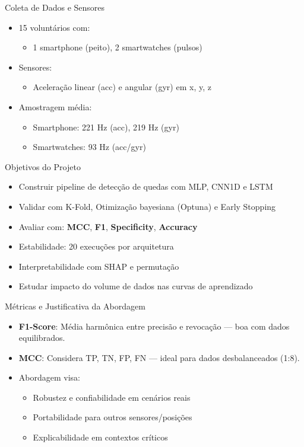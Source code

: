\documentclass[10pt]{beamer}
\begin{document}
\begin{frame}{Coleta de Dados e Sensores}
  \begin{itemize}
    \item 15 voluntários com:
    \begin{itemize}
      \item 1 smartphone (peito), 2 smartwatches (pulsos)
    \end{itemize}
    \item Sensores:
    \begin{itemize}
      \item Aceleração linear (acc) e angular (gyr) em x, y, z
    \end{itemize}
    \item Amostragem média:
    \begin{itemize}
      \item Smartphone: 221 Hz (acc), 219 Hz (gyr)
      \item Smartwatches: 93 Hz (acc/gyr)
    \end{itemize}
  \end{itemize}
\end{frame}


\begin{frame}{Objetivos do Projeto}
  \begin{itemize}
    \item Construir pipeline de detecção de quedas com MLP, CNN1D e LSTM
    \item Validar com K-Fold, Otimização bayesiana (Optuna) e Early Stopping
    \item Avaliar com: \textbf{MCC}, \textbf{F1}, \textbf{Specificity}, \textbf{Accuracy}
    \item Estabilidade: 20 execuções por arquitetura
    \item Interpretabilidade com SHAP e permutação
    \item Estudar impacto do volume de dados nas curvas de aprendizado
  \end{itemize}
\end{frame}

\begin{frame}{Métricas e Justificativa da Abordagem}
  \begin{itemize}
    \item \textbf{F1-Score}: Média harmônica entre precisão e revocação — boa com dados equilibrados.
    \item \textbf{MCC}: Considera TP, TN, FP, FN — ideal para dados desbalanceados (1:8).
    \item Abordagem visa:
    \begin{itemize}
      \item Robustez e confiabilidade em cenários reais
      \item Portabilidade para outros sensores/posições
      \item Explicabilidade em contextos críticos
    \end{itemize}
  \end{itemize}
\end{frame}
\end{document}
